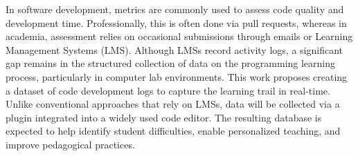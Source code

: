
\begin{resumoutfpr}%

In software development, metrics are commonly used to assess code quality and development time. Professionally, this is often done via pull requests, whereas in academia, assessment relies on occasional submissions through emails or Learning Management Systems (LMS). Although LMSs record activity logs, a significant gap remains in the structured collection of data on the programming learning process, particularly in computer lab environments. This work proposes creating a dataset of code development logs to capture the learning trail in real-time. Unlike conventional approaches that rely on LMSs, data will be collected via a plugin integrated into a widely used code editor. The resulting database is expected to help identify student difficulties, enable personalized teaching, and improve pedagogical practices.

\end{resumoutfpr}

